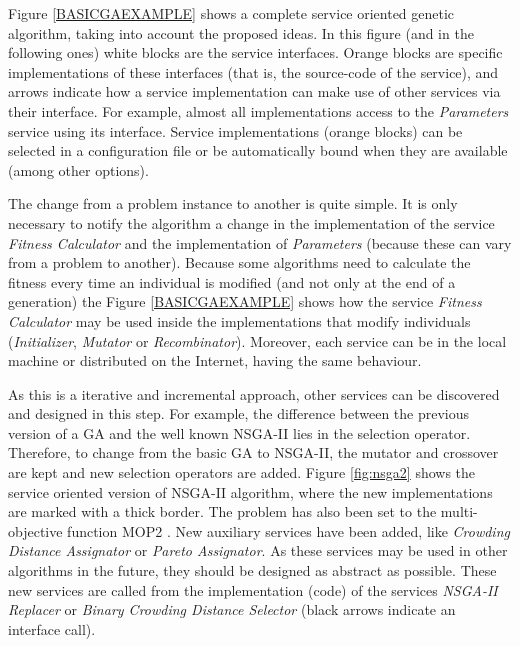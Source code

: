 Figure \ref{BASICGAEXAMPLE} shows a complete service oriented genetic algorithm, taking into account the proposed ideas. In this figure (and in the following ones) white blocks are the service interfaces. Orange blocks are specific implementations of these interfaces (that is, the source-code of the service), and  arrows indicate how a service implementation can make use of other services via their interface. For example, almost all implementations access to the {\em Parameters} service using its interface. Service implementations (orange blocks) can be selected in a configuration file or be automatically bound when they are available (among other options).



 The change from a problem instance to another is quite simple. It is only necessary to notify the algorithm a change in the implementation of the service {\em Fitness Calculator} and the implementation of {\em Parameters} (because these can vary from a problem to another). Because some algorithms need to calculate the fitness every time an individual is modified (and not only at the end of a generation) the Figure \ref{BASICGAEXAMPLE} shows how the service {\em Fitness Calculator} may be used inside the implementations that modify individuals ({\em Initializer}, {\em Mutator} or {\em Recombinator}). Moreover, each service can be in the local machine or distributed on the Internet, having the same behaviour. %


As this is a iterative and incremental approach, other services can be discovered and designed in this step. For example, the difference between the previous version of a GA and the well known NSGA-II \cite{NSGA2} lies in the selection operator. Therefore, to change from the basic GA to NSGA-II, the mutator and crossover are kept and new selection operators are added. Figure \ref{fig:nsga2} shows the service oriented version of NSGA-II algorithm, where the new implementations are marked with a thick border. The problem has also been set to the multi-objective function MOP2 \cite{ReviewMultiobj06}. New auxiliary services have been added, like {\em Crowding Distance Assignator} or {\em Pareto Assignator}. As these services may be used in other algorithms in the future, they should be designed as abstract as possible. These new services are called from the implementation (code) of the services {\em NSGA-II Replacer} or {\em Binary Crowding Distance Selector} (black arrows indicate an interface call). 




